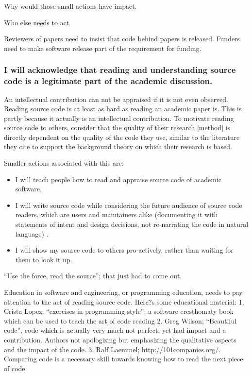 \documentclass[a4paper,UKenglish]{dagman}
\renewcommand{\paragraph}[1]{\subsubsection*{#1}\xspace}
\begin{document}
Why would those small actions have impact.



Who else needs to act

Reviewers of papers need to insist that code behind papers is released. Funders need to make software release part of the requirement for funding.



\paragraph{I will acknowledge that reading and understanding source code is a legitimate part of the academic discussion.}

An intellectual contribution can not be appraised if it is not even observed. Reading source code is at least as hard as reading an academic paper is. This is partly because it actually is an intellectual contribution. To motivate reading source code to others, consider that the quality of their research [method] is directly dependent on the quality of the code they use, similar to the literature they cite to support the background theory on which their research is based. 

Smaller actions associated with this are:
\begin{itemize}
\item I will teach people how to read and appraise source code of academic software.
\item I will write source code while considering the future audience of source code readers, which are users and maintainers alike (documenting it with statements of intent and design decisions, not re-narrating the code in natural language) .
\item I will show my source code to others pro-actively, rather than waiting for them to look it up.
\end{itemize}

``Use the force, read the source''; that just had to come out.

Education in software and engineering, or programming education, needs to pay attention to the act of reading source code. Here?s some educational material:
1.	Crista Lopez; ``exercises in programming style''; a software cresthomaty book which can be used to teach the art of code reading
2.	Greg Wilson; ``Beautiful code'', code which is actually very much not perfect, yet had impact and a contribution. Authors not apologizing but emphasizing the qualitative aspects and the impact of the code.
3.	Ralf Laemmel; http://101companies.org/. Comparing code is a necessary skill towards knowing how to read the next piece of code.
\end{document}
